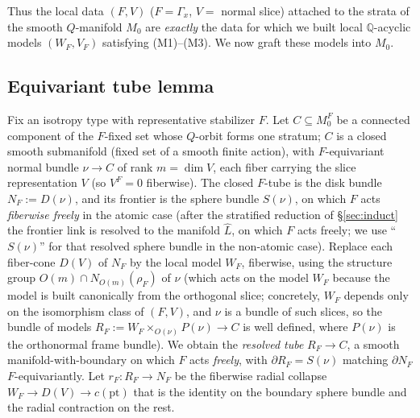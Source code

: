 \documentclass[12pt]{article}
\theoremstyle{definition}
\begin{document}
Thus the local data $(F,V)$ ($F=\Gamma_x$, $V=$ normal slice) attached to the
strata of the smooth $Q$-manifold $M_0$ are \emph{exactly} the data for which we
built local $\mathbb{Q}$-acyclic models $(W_F,V_F)$ satisfying (M1)--(M3). We now
graft these models into $M_0$.

\subsection{Equivariant tube lemma}

Fix an isotropy type with representative stabilizer $F$. Let $C\subseteq M_0^F$
be a connected component of the $F$-fixed set whose $Q$-orbit forms one stratum;
$C$ is a closed smooth submanifold (fixed set of a smooth finite action), with
$F$-equivariant normal bundle $\nu\to C$ of rank $m=\dim V$, each fiber carrying
the slice representation $V$ (so $V^F=0$ fiberwise). The closed
$F$-tube is the disk bundle $N_F:=D(\nu)$, and its frontier is the sphere bundle
$S(\nu)$, on which $F$ acts \emph{fiberwise freely} in the atomic case (after the
stratified reduction of \S\ref{sec:induct} the frontier link is resolved to the
manifold $\widehat L$, on which $F$ acts freely; we use ``$S(\nu)$'' for that
resolved sphere bundle in the non-atomic case). Replace each fiber-cone
$D(V)$ of $N_F$ by the local model $W_F$, fiberwise, using the structure group
$O(m)\cap N_{O(m)}(\rho_F)$ of $\nu$ (which acts on the model $W_F$ because the
model is built canonically from the orthogonal slice; concretely, $W_F$ depends
only on the isomorphism class of $(F,V)$, and $\nu$ is a bundle of such slices,
so the bundle of models $R_F:=W_F\times_{O(\nu)} P(\nu)\to C$ is well defined,
where $P(\nu)$ is the orthonormal frame bundle). We obtain the
\emph{resolved tube} $R_F\to C$, a smooth manifold-with-boundary on which $F$
acts \emph{freely}, with $\partial R_F=S(\nu)$ matching $\partial N_F$
$F$-equivariantly. Let $r_F\colon R_F\to N_F$ be the fiberwise radial
collapse $W_F\to D(V)\to c(\mathrm{pt})$ that is the identity on the boundary
sphere bundle and the radial contraction on the rest.
\end{document}
